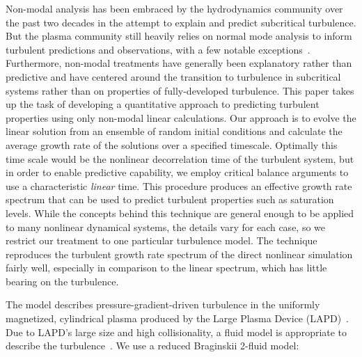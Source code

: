 \documentclass[letter,scriptaddress,twocolumn, prl,showkeys]{revtex4}
\begin{document}
Non-modal analysis has been embraced by the hydrodynamics community over the past two decades in the attempt to explain and predict subcritical turbulence. But the plasma community
still heavily relies on normal mode analysis to inform turbulent predictions and observations, with a few notable exceptions~\cite{camargo1998,camporeale2010,schekochihin2012}. 
Furthermore, non-modal treatments have generally been explanatory rather than predictive and have centered around the transition to turbulence in subcritical systems rather 
than on properties of fully-developed turbulence.
This paper takes up the task of developing a quantitative approach to predicting turbulent properties using only non-modal linear calculations. 
Our approach is to evolve the linear solution from an ensemble of random initial conditions 
and calculate the average growth rate of the solutions over a specified timescale.  Optimally this time scale would be the
nonlinear decorrelation time of the turbulent system, but in order to enable predictive capability, we employ critical balance
arguments to use a characteristic \emph{linear} time.
This procedure produces an effective growth rate spectrum that can be used to predict turbulent properties such as saturation levels.
While the concepts behind this technique are general enough to be applied to many nonlinear dynamical systems, the details vary for each case, 
so we restrict our treatment to one particular turbulence model. The technique reproduces the turbulent growth rate spectrum of the direct nonlinear simulation fairly well, especially
in comparison to the linear spectrum, which has little bearing on the turbulence.

The model describes pressure-gradient-driven turbulence in the uniformly magnetized, cylindrical plasma
produced by the Large Plasma Device (LAPD)~\cite{gekelman1991}. 
Due to LAPD's large size and high collisionality, a fluid model is
appropriate to describe the turbulence~\cite{Popovich2010a,Popovich2010b,Umansky2011}. We use a reduced Braginskii 2-fluid model:
\end{document}

